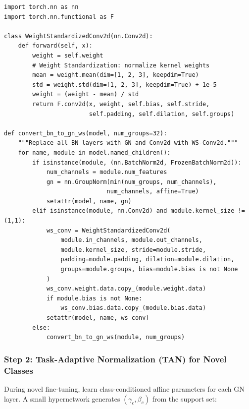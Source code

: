 \documentclass[11pt,a4paper]{article}
\begin{document}
\begin{lstlisting}[caption={GN+WS replacement in ResNet backbone}]
import torch.nn as nn
import torch.nn.functional as F

class WeightStandardizedConv2d(nn.Conv2d):
    def forward(self, x):
        weight = self.weight
        # Weight Standardization: normalize kernel weights
        mean = weight.mean(dim=[1, 2, 3], keepdim=True)
        std = weight.std(dim=[1, 2, 3], keepdim=True) + 1e-5
        weight = (weight - mean) / std
        return F.conv2d(x, weight, self.bias, self.stride,
                        self.padding, self.dilation, self.groups)

def convert_bn_to_gn_ws(model, num_groups=32):
    """Replace all BN layers with GN and Conv2d with WS-Conv2d."""
    for name, module in model.named_children():
        if isinstance(module, (nn.BatchNorm2d, FrozenBatchNorm2d)):
            num_channels = module.num_features
            gn = nn.GroupNorm(min(num_groups, num_channels),
                             num_channels, affine=True)
            setattr(model, name, gn)
        elif isinstance(module, nn.Conv2d) and module.kernel_size != (1,1):
            ws_conv = WeightStandardizedConv2d(
                module.in_channels, module.out_channels,
                module.kernel_size, stride=module.stride,
                padding=module.padding, dilation=module.dilation,
                groups=module.groups, bias=module.bias is not None
            )
            ws_conv.weight.data.copy_(module.weight.data)
            if module.bias is not None:
                ws_conv.bias.data.copy_(module.bias.data)
            setattr(model, name, ws_conv)
        else:
            convert_bn_to_gn_ws(module, num_groups)
\end{lstlisting}

\subsubsection{Step 2: Task-Adaptive Normalization (TAN) for Novel Classes}

During novel fine-tuning, learn class-conditioned affine parameters for each GN layer. A small hypernetwork generates $(\gamma_c, \beta_c)$ from the support set:
\end{document}
